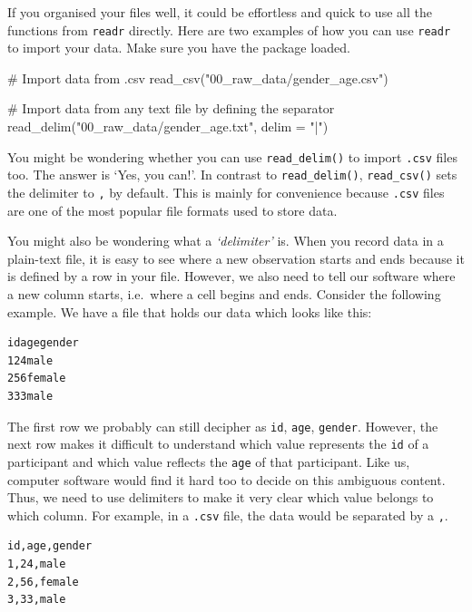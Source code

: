 \documentclass[
  letterpaper,
]{krantz}
\makeatletter
\newenvironment{Shaded}{\begin{snugshade}}{\end{snugshade}}
\newcommand{\AttributeTok}[1]{\textcolor[rgb]{0.40,0.45,0.13}{#1}}
\newcommand{\CommentTok}[1]{\textcolor[rgb]{0.37,0.37,0.37}{#1}}
\newcommand{\FunctionTok}[1]{\textcolor[rgb]{0.28,0.35,0.67}{#1}}
\newcommand{\NormalTok}[1]{\textcolor[rgb]{0.00,0.23,0.31}{#1}}
\newcommand{\StringTok}[1]{\textcolor[rgb]{0.13,0.47,0.30}{#1}}
\newenvironment{kframe}{%
\medskip{}
\setlength{\fboxsep}{.8em}
 \def\at@end@of@kframe{}%
 \ifinner\ifhmode%
  \def\at@end@of@kframe{\end{minipage}}%
  \begin{minipage}{\columnwidth}%
 \fi\fi%
 \def\FrameCommand##1{\hskip\@totalleftmargin \hskip-\fboxsep
 \colorbox{shadecolor}{##1}\hskip-\fboxsep
     \hskip-\linewidth \hskip-\@totalleftmargin \hskip\columnwidth}%
 \MakeFramed {\advance\hsize-\width
   \@totalleftmargin\z@ \linewidth\hsize
   \@setminipage}}%
 {\par\unskip\endMakeFramed%
 \at@end@of@kframe}
\renewenvironment{Shaded}{\begin{kframe}}{\end{kframe}}
\makeatother
\begin{document}
If you organised your files well, it could be effortless and quick to
use all the functions from \texttt{readr} directly. Here are two
examples of how you can use \texttt{readr} to import your data. Make
sure you have the package loaded.

\begin{Shaded}
\begin{Highlighting}[]
\CommentTok{\# Import data from \textquotesingle{}.csv\textquotesingle{}}
\FunctionTok{read\_csv}\NormalTok{(}\StringTok{"00\_raw\_data/gender\_age.csv"}\NormalTok{)}

\CommentTok{\# Import data from any text file by defining the separator}
\FunctionTok{read\_delim}\NormalTok{(}\StringTok{"00\_raw\_data/gender\_age.txt"}\NormalTok{, }\AttributeTok{delim =} \StringTok{"|"}\NormalTok{)}
\end{Highlighting}
\end{Shaded}

You might be wondering whether you can use \texttt{read\_delim()} to
import \texttt{.csv} files too. The answer is `Yes, you can!'. In
contrast to \texttt{read\_delim()}, \texttt{read\_csv()} sets the
delimiter to \texttt{,} by default. This is mainly for convenience
because \texttt{.csv} files are one of the most popular file formats
used to store data.

You might also be wondering what a \emph{`delimiter'} is. When you
record data in a plain-text file, it is easy to see where a new
observation starts and ends because it is defined by a row in your file.
However, we also need to tell our software where a new column starts,
i.e.~where a cell begins and ends. Consider the following example. We
have a file that holds our data which looks like this:

\begin{verbatim}
idagegender
124male
256female
333male
\end{verbatim}

The first row we probably can still decipher as \texttt{id},
\texttt{age}, \texttt{gender}. However, the next row makes it difficult
to understand which value represents the \texttt{id} of a participant
and which value reflects the \texttt{age} of that participant. Like us,
computer software would find it hard too to decide on this ambiguous
content. Thus, we need to use delimiters to make it very clear which
value belongs to which column. For example, in a \texttt{.csv} file, the
data would be separated by a \texttt{,}.

\begin{verbatim}
id,age,gender
1,24,male
2,56,female
3,33,male
\end{verbatim}
\end{document}
